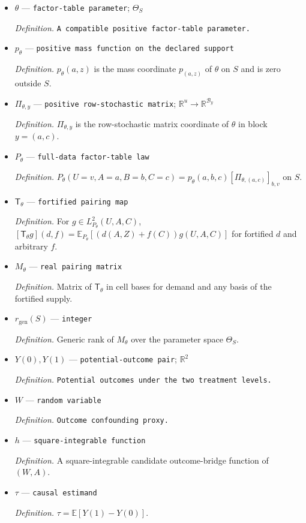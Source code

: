 \documentclass{article}
\begin{document}
\begin{itemize}
  \par\smallskip\noindent\emph{Definition.} The set of \(\theta=(p,(\Pi_y)_{y\in\mathcal I_S})\) with \(p_s>0\), \(\sum_{s\in S}p_s=1\), and each \(\Pi_y\in(0,1)^{|\mathcal B_y|\times u}\) row-stochastic.
  \item \(\theta\) --- \texttt{factor-\allowbreak{}table parameter}; \(\Theta_S\)
  \par\smallskip\noindent\emph{Definition.} \texttt{A compatible positive factor-\allowbreak{}table parameter.}
  \item \(p_\theta\) --- \texttt{positive mass function on the declared support}
  \par\smallskip\noindent\emph{Definition.} \(p_\theta(a,z)\) is the mass coordinate \(p_{(a,z)}\) of \(\theta\) on \(S\) and is zero outside \(S\).
  \item \(\Pi_{\theta,y}\) --- \texttt{positive row-\allowbreak{}stochastic matrix}; \(\mathbb R^u\to\mathbb R^{\mathcal B_y}\)
  \par\smallskip\noindent\emph{Definition.} \(\Pi_{\theta,y}\) is the row-stochastic matrix coordinate of \(\theta\) in block \(y=(a,c)\).
  \item \(P_\theta\) --- \texttt{full-\allowbreak{}data factor-\allowbreak{}table law}
  \par\smallskip\noindent\emph{Definition.} \(P_\theta(U=v,A=a,B=b,C=c)=p_\theta(a,b,c)[\Pi_{\theta,(a,c)}]_{b,v}\) on \(S\).
  \item \(\mathsf T_\theta\) --- \texttt{fortified pairing map}
  \par\smallskip\noindent\emph{Definition.} For \(g\in L^2_{P_\theta}(U,A,C)\), \([\mathsf T_\theta g](d,f)=\mathbb E_{P_\theta}[(d(A,Z)+f(C))g(U,A,C)]\) for fortified \(d\) and arbitrary \(f\).
  \item \(M_\theta\) --- \texttt{real pairing matrix}
  \par\smallskip\noindent\emph{Definition.} Matrix of \(\mathsf T_\theta\) in cell bases for demand and any basis of the fortified supply.
  \item \(r_{\mathrm{gen}}(S)\) --- \texttt{integer}
  \par\smallskip\noindent\emph{Definition.} Generic rank of \(M_\theta\) over the parameter space \(\Theta_S\).
  \item \(Y(0),Y(1)\) --- \texttt{potential-\allowbreak{}outcome pair}; \(\mathbb R^2\)
  \par\smallskip\noindent\emph{Definition.} \texttt{Potential outcomes under the two treatment levels.}
  \item \(W\) --- \texttt{random variable}
  \par\smallskip\noindent\emph{Definition.} \texttt{Outcome confounding proxy.}
  \item \(h\) --- \texttt{square-\allowbreak{}integrable function}
  \par\smallskip\noindent\emph{Definition.} A square-integrable candidate outcome-bridge function of \((W,A)\).
  \item \(\tau\) --- \texttt{causal estimand}
  \par\smallskip\noindent\emph{Definition.} \(\tau=\mathbb E[Y(1)-Y(0)]\).
\end{itemize}
\end{document}
